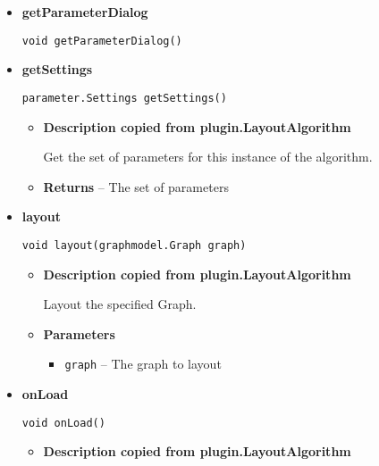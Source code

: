 {{{{{{{{\begin{itemize}
{\begin{itemize}
{Get the full name of the layout.
}
\item{{\bf  Returns} -- 
The full name of the layout. 
}%
\end{itemize}
}%
\item{ 
{\bf  getParameterDialog}\\
\begin{lstlisting}[frame=none]
void getParameterDialog()\end{lstlisting} %
}%
\item{ 
{\bf  getSettings}\\
\begin{lstlisting}[frame=none]
parameter.Settings getSettings()\end{lstlisting} %
\begin{itemize}
\item{
{\bf  Description copied from plugin.LayoutAlgorithm{\small {}} }

Get the set of parameters for this instance of the algorithm.
}
\item{{\bf  Returns} -- 
The set of parameters 
}%
\end{itemize}
}%
\item{ 
{\bf  layout}\\
\begin{lstlisting}[frame=none]
void layout(graphmodel.Graph graph)\end{lstlisting} %
\begin{itemize}
\item{
{\bf  Description copied from plugin.LayoutAlgorithm{\small {}} }

Layout the specified Graph.
}
\item{
{\bf  Parameters}
  \begin{itemize}
   \item{
\texttt{graph} -- The graph to layout}
  \end{itemize}
}%
\end{itemize}
}%
\item{ 
{\bf  onLoad}\\
\begin{lstlisting}[frame=none]
void onLoad()\end{lstlisting} %
\begin{itemize}
\item{
{\bf  Description copied from plugin.LayoutAlgorithm{\small {}} }

}
\end{itemize}}
\end{itemize}}}}}}}}}
